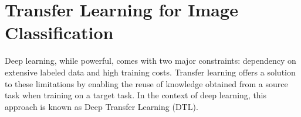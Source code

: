 \documentclass[a4paper,12pt]{report}
\begin{document}




\section*{Transfer Learning for Image Classification}
Deep learning, while powerful, comes with two major constraints: dependency on extensive labeled data and high training costs\citep{iman2022review}. Transfer learning offers a solution to these limitations by enabling the reuse of knowledge obtained from a source task when training on a target task. In the context of deep learning, this approach is known as Deep Transfer Learning (DTL)\citep{iman2022review}.
\end{document}
